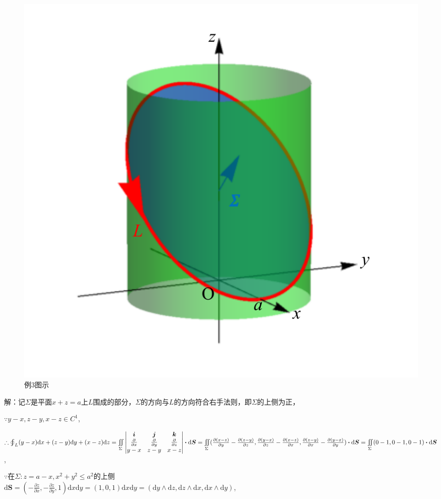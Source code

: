\documentclass[12pt,UTF8,fleqn]{ctexart}
\newcommand{\BLOInt}[2]{\varoint\nolimits_{#1}#2}
\newcommand{\md}[1]{\mathrm d#1}
\newcommand{\BSIInt}[2]{\iint\limits_{#1}#2}
\newcommand{\pp}[2]{\frac{\partial #1}{\partial #2}}
\begin{document}
\begin{enumerate}
\begin{figure}[H]
\begin{center}
\includegraphics[height=0.5\textheight]{Figures24/Fig13-5-2-2.pdf}
\end{center}
\caption{例3图示}
\label{13-5-2-2}
\end{figure}

解：记$\Sigma$是平面$x+z=a$上$L$围成的部分，$\Sigma$的方向与$L$的方向符合右手法则，即$\Sigma$的上侧为正，

$\because y-x,z-y,x-z\in C^1$,

$\therefore\BLOInt L{(y-x)\md x+(z-y)\md y+(x-z)\md z}=\BSIInt\Sigma{\begin{vmatrix}
\bm i&\bm j&\bm k\\
\frac\partial{\partial x}&\frac\partial{\partial y}&\frac\partial{\partial z}\\
y-x&z-y&x-z
\end{vmatrix}\bm\cdot\md\bm S}\\
=\BSIInt\Sigma{(\pp{(x-z)}y-\pp{(z-y)}z,\pp{(y-x)}z-\pp{(x-z)}x,\pp{(z-y)}x-\pp{(y-x)}y)\bm\cdot\md\bm S}=\BSIInt\Sigma{(0-1,0-1,0-1)\bm\cdot\md\bm S}$,

$\because$在$\Sigma:z=a-x,x^2+y^2\leqslant a^2$的上侧\\
$\md\bm S=(-\pp zx,-\pp zy,1)\md x\md y=(1,0,1)\md x\md y=(\md y\wedge\md z,\md z\wedge\md x,\md x\wedge\md y)$,


\end{enumerate}
\end{document}
